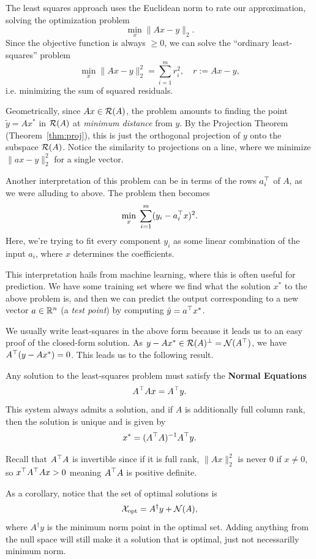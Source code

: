 \documentclass[11 pt]{scrartcl}
\newcommand{\opt}{\text{opt}}
\begin{document}
The least squares approach uses the Euclidean norm to rate our approximation, solving the optimization problem 
\[ \min_x \|Ax - y\|_2.\] 
Since the objective function is always $\geq 0$, we can solve the ``ordinary least-squares'' problem 
\[ \min_x \|Ax-y\|^2_2 = \sum_{i=1}^m r_i^2, \quad r := Ax-y,\] 
i.e. minimizing the sum of squared residuals. 

Geometrically, since $Ax\in \mathcal R(A)$, the problem amounts to finding the point $\tilde{y} = Ax^*$ in $\mathcal R(A)$ at \emph{minimum distance} from $y$. 
By the Projection Theorem (Theorem~\ref{thm:proj}), this is just the orthogonal projection of $y$ onto the subspace $\mathcal R(A)$.
Notice the similarity to projections on a line, where we minimize $\|ax-y\|_2^2$ for a single vector. 

Another interpretation of this problem can be in terms of the rows $a_i^\top$ of $A$, as we were alluding to above. 
The problem then becomes 
\[ \min_x \; \sum_{i=1}^m (y_i - a_i^\top x)^2.\] 
Here, we're trying to fit every component $y_i$ as some linear combination of the input $a_i$, where $x$ determines the coefficients. 

This interpretation hails from machine learning, where this is often useful for prediction. 
We have some training set where we find what the solution $x^*$ to the above problem is, and then we can predict the output corresponding to a new vector $a\in \mathbb R^n$ (a \emph{test point}) by computing $\hat{y} = a^\top x^*$. 

We usually write least-squares in the above form because it leads us to an easy proof of the closed-form solution. 
As $y-Ax^* \in \mathcal R(A)^\perp = \mathcal N(A^\top)$, we have $A^\top (y - Ax^*) = 0$. 
This leads us to the following result. 

\begin{theorem}
Any solution to the least-squares problem must satisfy the \textbf{Normal Equations} 
    \[ A^\top Ax = A^\top y.\] 
This system always admits a solution, and if $A$ is additionally full column rank, then the solution is unique and is given by 
\[ x^* = (A^\top A)^{-1} A^\top y.\] 
\end{theorem}
Recall that $A^\top A$ is invertible since if it is full rank, $\|Ax\|_2^2$ is never 0 if $x\not= 0$, so $x^\top A^\top A x > 0$ meaning $A^\top A$ is positive definite. 

As a corollary, notice that the set of optimal solutions is 
\[ \Xcal_{\opt} = A^\dagger y + \Ncal(A),\] 
where $A^\dagger y$ is the minimum norm point in the optimal set. 
Adding anything from the null space will still make it a solution that is optimal, just not necessarilly minimum norm. 
\end{document}
